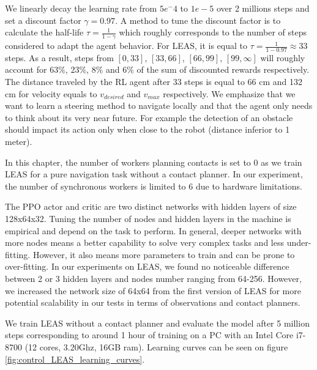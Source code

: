 We linearly decay the learning rate from $5e^-4$ to $1e-5$ over 2 millions steps and set a discount factor $\gamma = 0.97$. 
A method to tune the discount factor is to calculate the half-life $\tau = \frac{1}{1-\gamma}$ which roughly corresponds to the number of steps considered to adapt the agent behavior. For LEAS, it is equal to $\tau = \frac{1}{1-0.97} \approx 33$ steps. 
As a result, steps from $[0,33]$, $[33,66]$, $[66,99]$, $[99,\infty]$ will roughly account for $63\%$, $23\%$, $8\%$ and $6\%$ of the sum of discounted rewards respectively. 
The distance traveled by the RL agent after 33 steps is equal to 66 cm and 132 cm for velocity equals to $v_{desired}$ and $v_{max}$ respectively.
We emphasize that we want to learn a steering method to navigate locally and that the agent only needs to think about its very near future. For example the detection of an obstacle should impact its action only when close to the robot (distance inferior to 1 meter).

In this chapter, the number of workers planning contacts is set to 0 as we train LEAS for a pure navigation task without a contact planner. In our experiment, the number of synchronous workers is limited to 6 due to hardware limitations.

The PPO actor and critic are two distinct networks with hidden layers of size 128x64x32. Tuning the number of nodes and hidden layers in the machine is empirical and depend on the task to perform. In general, deeper networks with more nodes means a better capability to solve very complex tasks and less under-fitting. However, it also means more parameters to train and can be prone to over-fitting. In our experiments on LEAS, we found no noticeable difference between 2 or 3 hidden layers and nodes number ranging from 64-256. However, we increased the network size of 64x64 from the first version of LEAS \cite{LEAS} for more potential scalability in our tests in terms of observations and contact planners.

We train LEAS without a contact planner and evaluate the model after 5 million steps corresponding to around 1 hour of training on a PC with an Intel Core i7-8700 (12 cores, 3.20Ghz, 16GB ram). Learning curves can be seen on figure \ref{fig:control_LEAS_learning_curves}.


